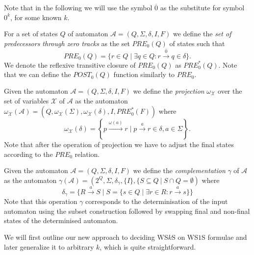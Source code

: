 Note that in the following we will use the symbol $\overline{0}$ as the
substitute for symbol $0^k$, for some known $k$.

\begin{defz}
For a set of states $Q$ of automaton $\mathcal{A} = (Q, \Sigma, \delta, I, F)$
we define the \emph{set of predecessors through zero tracks} as the set $\mathit{PRE}_0(Q)$ of states such that
\begin{equation}
 \mathit{PRE}_0(Q) = \{r \in Q \mid \exists q \in Q: r
 \overset{\overline{0}}{\longrightarrow} q \in \delta\}.
\end{equation}
We denote the reflexive transitive closure of $PRE_0(Q)$ as $PRE_0^*(Q)$. Note
that we can define the $POST_0(Q)$ function similarly to $PRE_0$.
\end{defz}

\begin{defz}
 Given the automaton $\mathcal{A} = (Q, \Sigma, \delta, I, F)$ we define the
 \emph{projection} $\omega_\mathcal{X}$ over the set of variables $\mathcal{X}$
 of $\mathcal{A}$ as the automaton $\omega_\mathcal{X}(\mathcal{A}) = (Q,
 \omega_{\mathcal{X}}(\Sigma), \omega_{\mathcal{X}}(\delta), I, PRE_0^*(F))$
 where
 \begin{equation}
  \omega_{\mathcal{X}}(\delta) = \left\{ p \overset{\omega(a)}{\longrightarrow}
  r \mid p \overset{a}{\rightarrow} r \in \delta, a \in \Sigma\right\}.
 \end{equation}
 Note that after the operation of projection we have to adjust the final states
 according to the $PRE_0$ relation.
\end{defz}

\begin{defz}
 Given the automaton $\mathcal{A} = (Q, \Sigma, \delta, I, F)$ we define the
 \emph{complementation} $\gamma$ of $\mathcal{A}$ as the automaton
 $\gamma(\mathcal{A}) = (2^Q, \Sigma, \delta_\gamma, \{I\}, \{S \subseteq Q\
 |\ S \cap Q = \emptyset)$ where
 \begin{equation}
  \delta_\gamma = \{R \overset{a}{\rightarrow} S \mid S = \{s \in Q \mid \exists
  r \in R: r \overset{a}{\rightarrow} s\}\}
 \end{equation}
 Note that this operation $\gamma$ corresponds to the determinisation of the
 input automaton using the subset construction followed by swapping final and
 non-final states of the determinised automaton.
\end{defz}

We will first outline our new approach to deciding WS$k$S on WS$1$S formulae and
later generalize it to arbitrary $k$, which is quite straightforward.

